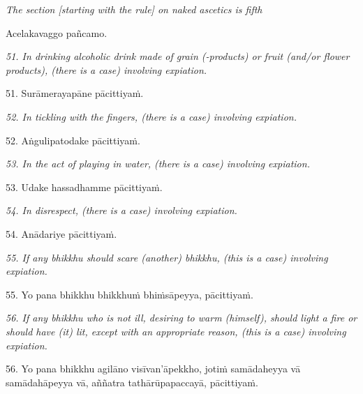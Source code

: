 \documentclass[11pt]{article}
\begin{document}
\begin{paracol}{2}
\begin{column}
{\itshape\footnotesize
The section [starting with the rule] on naked ascetics is fifth
}
\switchcolumn

\begin{flushleft}
Acelakavaggo pañcamo.
\switchcolumn*
\end{flushleft}

{\itshape\footnotesize
51. In drinking alcoholic drink made of grain (-products) or fruit (and/or flower products), (there is a case) involving expiation.
}
\switchcolumn

\begin{flushleft}
51. Surāmerayapāne pācittiyaṁ.
\switchcolumn*
\end{flushleft}

{\itshape\footnotesize
52. In tickling with the fingers, (there is a case) involving expiation.
}
\switchcolumn

\begin{flushleft}
52. Aṅgulipatodake pācittiyaṁ.
\switchcolumn*
\end{flushleft}

{\itshape\footnotesize
53. In the act of playing in water, (there is a case) involving expiation.
}
\switchcolumn

\begin{flushleft}
53. Udake hassadhamme pācittiyaṁ.
\switchcolumn*
\end{flushleft}

{\itshape\footnotesize
54. In disrespect, (there is a case) involving expiation.
}
\switchcolumn

\begin{flushleft}
54. Anādariye pācittiyaṁ.
\switchcolumn*
\end{flushleft}

{\itshape\footnotesize
55. If any bhikkhu should scare (another) bhikkhu, (this is a case) involving expiation.
}
\switchcolumn

\begin{flushleft}
55. Yo pana bhikkhu bhikkhuṁ bhiṁsāpeyya, pācittiyaṁ.
\switchcolumn*
\end{flushleft}

{\itshape\footnotesize
56. If any bhikkhu who is not ill, desiring to warm (himself), should light a fire or should have (it) lit, except with an appropriate reason, (this is a case) involving expiation.
}
\switchcolumn

\begin{flushleft}
56. Yo pana bhikkhu agilāno visīvan’āpekkho, jotiṁ samādaheyya vā samādahāpeyya vā, aññatra tathārūpapaccayā, pācittiyaṁ.
\switchcolumn*
\end{flushleft}


\end{column}
\end{paracol}
\end{document}

